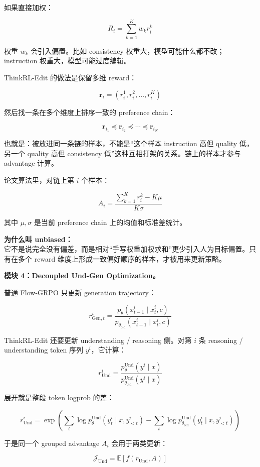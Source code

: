 如果直接加权：

\[
R_i
=
\sum_{k=1}^{K}
w_k r_i^k
\]

权重 $w_k$ 会引入偏置。比如 consistency 权重大，模型可能什么都不改；instruction 权重大，模型可能过度编辑。

ThinkRL-Edit 的做法是保留多维 reward：

\[
\mathbf{r}_i
=
\left(
r_i^1,
r_i^2,
\ldots,
r_i^K
\right)
\]

然后找一条在多个维度上排序一致的 preference chain：

\[
\mathbf{r}_{i_1}
\preceq
\mathbf{r}_{i_2}
\preceq
\cdots
\preceq
\mathbf{r}_{i_N}
\]

也就是：被放进同一条链的样本，不能是“这个样本 instruction 高但 quality 低，另一个 quality 高但 consistency 低”这种互相打架的关系。链上的样本才参与 advantage 计算。

论文算法里，对链上第 $i$ 个样本：

\[
A_i
=
\frac{
\sum_{k=1}^{K}r_i^k
-
K\mu
}{
K\sigma
}
\]

其中 $\mu,\sigma$ 是当前 preference chain 上的均值和标准差统计。

\begin{warnbox}
\textbf{为什么叫 unbiased：}\\
它不是说完全没有偏差，而是相对“手写权重加权求和”更少引入人为目标偏置。只有在多个 reward 维度上形成一致偏好顺序的样本，才被用来更新策略。
\end{warnbox}

\textbf{模块 4：Decoupled Und-Gen Optimization。}

普通 Flow-GRPO 只更新 generation trajectory：

\[
r_{\text{Gen},t}^{i}
=
\frac{
p_\theta(x_{t-1}^i\mid x_t^i,c)
}{
p_{\theta_\text{old}}(x_{t-1}^i\mid x_t^i,c)
}
\]

ThinkRL-Edit 还要更新 understanding / reasoning 侧。对第 $i$ 条 reasoning / understanding token 序列 $y^i$，它计算：

\[
r_\text{Und}^{i}
=
\frac{
p_\theta^\text{Und}(y^i\mid x)
}{
p_{\theta_\text{old}}^\text{Und}(y^i\mid x)
}
\]

展开就是整段 token logprob 的差：

\[
r_\text{Und}^{i}
=
\exp
\left(
\sum_t
\log p_\theta^\text{Und}
(y_t^i\mid x,y_{<t}^{i})
-
\sum_t
\log p_{\theta_\text{old}}^\text{Und}
(y_t^i\mid x,y_{<t}^{i})
\right)
\]

于是同一个 grouped advantage $A_i$ 会用于两类更新：

\[
\mathcal{J}_\text{Und}
=
\mathbb{E}
\left[
f(r_\text{Und},A)
\right]
\]


